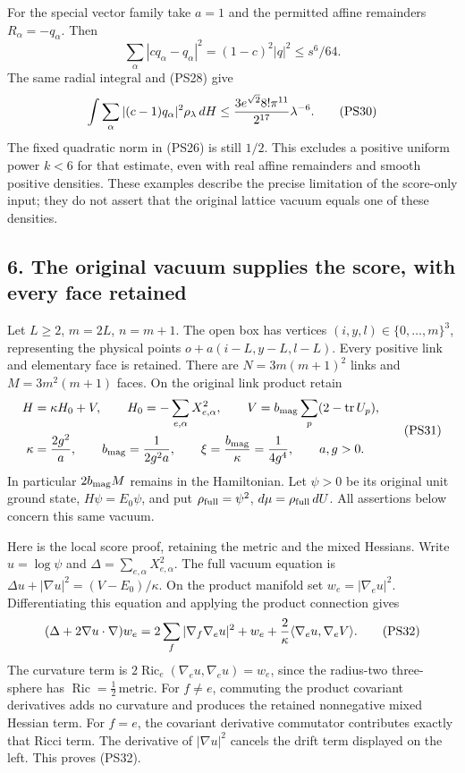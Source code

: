 \documentclass[11pt]{article}
\begin{document}
For the special vector family take \(a=1\) and the permitted
affine remainders \(R_\alpha=-q_\alpha\). Then
\[
 \sum_\alpha|cq_\alpha-q_\alpha|^2
 =(1-c)^2|q|^2\le s^6/64.
 \]
The same radial integral and (PS28) give
\[
 \int\sum_\alpha|(c-1)q_\alpha|^2\rho_\lambda\,dH
 \le {3e^{\sqrt2}8!\pi^{11}\over2^{17}}\lambda^{-6}.
 \tag{PS30}
\]
The fixed quadratic norm in (PS26) is still \(1/2\).
This excludes a positive uniform power \(k<6\) for that estimate,
even with real affine remainders and smooth positive densities.
These examples describe the precise limitation of the score-only
input; they do not assert that the original lattice vacuum equals
one of these densities.

\subsection*{6. The original vacuum supplies the score, with every face retained}

Let \(L\ge2\), \(m=2L\), \(n=m+1\). The open box has vertices
\((i,y,l)\in\{0,\ldots,m\}^3\), representing the physical points
\(o+a(i-L,y-L,l-L)\). Every positive link and elementary face is
retained. There are \(N=3m(m+1)^2\) links and
\(M=3m^2(m+1)\) faces. On the original link product retain
\[
 \begin{aligned}
 H&=\kappa H_0+V,\qquad
 H_0=-\sum_{e,\alpha}X_{e,\alpha}^2,\qquad
 V=b_{\rm mag}\sum_p(2-\operatorname{tr}U_p),\\
 \kappa&={2g^2\over a},\qquad b_{\rm mag}={1\over2g^2a},\qquad
 \xi={b_{\rm mag}\over\kappa}={1\over4g^4},\qquad a,g>0.
 \end{aligned}
 \tag{PS31}
\]
In particular \(2b_{\rm mag}M\) remains in the Hamiltonian.
Let \(\psi>0\) be its original unit ground state, \(H\psi=E_0\psi\),
and put \(\rho_{\rm full}=\psi^2\), \(d\mu=\rho_{\rm full}\,dU\).
All assertions below concern this same vacuum.

Here is the local score proof, retaining the metric and the mixed
Hessians. Write \(u=\log\psi\) and
\(\Delta=\sum_{e,\alpha}X_{e,\alpha}^2\). The full vacuum equation
is
\(\Delta u+|\nabla u|^2=(V-E_0)/\kappa\).
On the product manifold set \(w_e=|\nabla_eu|^2\). Differentiating
this equation and applying the product connection gives
\[
 (\Delta+2\nabla u\cdot\nabla)w_e
 =2\sum_f|\nabla_f\nabla_eu|^2+w_e
           +{2\over\kappa}\langle\nabla_eu,\nabla_eV\rangle.
 \tag{PS32}
\]
The curvature term is \(2\operatorname{Ric}_e(\nabla_eu,\nabla_eu)
=w_e\), since the radius-two three-sphere has
\(\operatorname{Ric}=\tfrac12\,\mathrm{metric}\).
For \(f\ne e\), commuting the product covariant derivatives adds
no curvature and produces the retained nonnegative mixed Hessian
term. For \(f=e\), the covariant derivative commutator contributes
exactly that Ricci term. The derivative of \(|\nabla u|^2\) cancels
the drift term displayed on the left. This proves (PS32).
\end{document}
